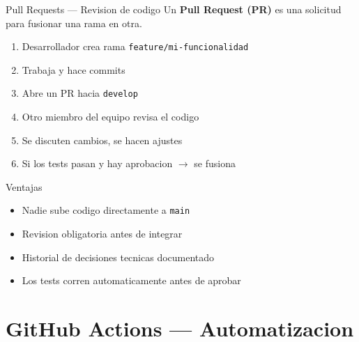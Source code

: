 \documentclass[aspectratio=169]{beamer}
\begin{document}
\begin{frame}{Pull Requests --- Revision de codigo}
  Un \textbf{Pull Request (PR)} es una solicitud para fusionar una rama en otra.

  \vspace{0.3cm}

  \begin{enumerate}
    \item Desarrollador crea rama \texttt{feature/mi-funcionalidad}
    \item Trabaja y hace commits
    \item Abre un PR hacia \texttt{develop}
    \item Otro miembro del equipo revisa el codigo
    \item Se discuten cambios, se hacen ajustes
    \item Si los tests pasan y hay aprobacion $\rightarrow$ se fusiona
  \end{enumerate}

  \vspace{0.3cm}

  \begin{exampleblock}{Ventajas}
    \begin{itemize}
      \item Nadie sube codigo directamente a \texttt{main}
      \item Revision obligatoria antes de integrar
      \item Historial de decisiones tecnicas documentado
      \item Los tests corren automaticamente antes de aprobar
    \end{itemize}
  \end{exampleblock}
\end{frame}

\section{GitHub Actions --- Automatizacion}
\end{document}
